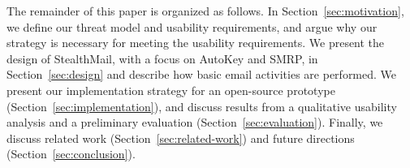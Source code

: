 The remainder of this paper is organized as follows.  In Section~\ref{sec:motivation}, 
we define our threat model and usability requirements, and argue why our strategy is necessary 
for meeting the usability requirements. We present the design of StealthMail, with a focus on AutoKey and SMRP,  
in Section~\ref{sec:design} and describe how basic 
email activities are performed. We present our implementation strategy for an 
open-source prototype (Section~\ref{sec:implementation}), and discuss results from a qualitative usability 
analysis and a preliminary evaluation (Section~\ref{sec:evaluation}).  
Finally, we discuss related work (Section~\ref{sec:related-work}) and future directions (Section~\ref{sec:conclusion}).
